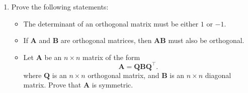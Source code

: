 \documentclass[]{book}
\providecommand{\tightlist}{%
  \setlength{\itemsep}{0pt}\setlength{\parskip}{0pt}}
\theoremstyle{definition}
\theoremstyle{definition}
\theoremstyle{definition}
\theoremstyle{remark}
\begin{document}
\begin{enumerate}
\def\labelenumi{\arabic{enumi}.}
\setcounter{enumi}{4}
\tightlist
\item
  Prove the following statements:

  \begin{itemize}
  \tightlist
  \item
    The determinant of an orthogonal matrix must be either \(1\) or \(-1\).
  \item
    If \(\boldsymbol A\) and \(\boldsymbol B\) are orthogonal matrices, then \(\boldsymbol A\boldsymbol B\) must also be orthogonal.
  \item
    Let \(\boldsymbol A\) be an \(n\times n\) matrix of the form
    \[\boldsymbol A= \boldsymbol Q\boldsymbol B\boldsymbol Q^\top.\]
    where \(\boldsymbol Q\) is an \(n\times n\) orthogonal matrix, and \(\boldsymbol B\) is an \(n\times n\) diagonal matrix. Prove that \(\boldsymbol A\) is symmetric.
  \end{itemize}
\end{enumerate}
\end{document}
